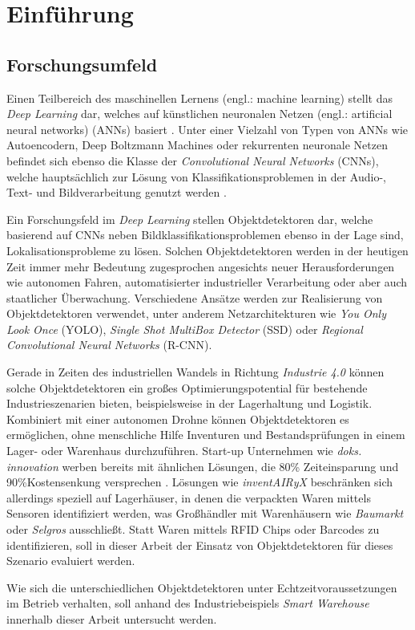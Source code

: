 \chapter{Einführung}

\section{Forschungsumfeld}

Einen Teilbereich des maschinellen Lernens (engl.: machine learning) stellt das \textit{Deep Learning} dar, welches auf künstlichen neuronalen Netzen (engl.: artificial neural networks) (ANNs) basiert \cite[S. 253]{AurelienGeron.2018}. Unter einer Vielzahl von Typen von ANNs wie Autoencodern, Deep Boltzmann Machines oder rekurrenten neuronale Netzen befindet sich ebenso die Klasse der \textit{Convolutional Neural Networks} (CNNs), welche hauptsächlich zur Lösung von Klassifikationsproblemen in der Audio-, Text- und Bildverarbeitung genutzt werden \cite{MathWorks.2019}.

Ein Forschungsfeld im \textit{Deep Learning} stellen Objektdetektoren dar, welche basierend auf CNNs neben Bildklassifikationsproblemen ebenso in der Lage sind, Lokalisationsprobleme zu lösen. Solchen Objektdetektoren werden in der heutigen Zeit immer mehr Bedeutung zugesprochen angesichts neuer Herausforderungen wie autonomen Fahren, automatisierter industrieller Verarbeitung oder aber auch staatlicher Überwachung. Verschiedene Ansätze werden zur Realisierung von Objektdetektoren verwendet, unter anderem Netzarchitekturen wie \textit{You Only Look Once} (YOLO), \textit{Single Shot MultiBox Detector} (SSD) oder \textit{Regional Convolutional Neural Networks} (R-CNN). 

Gerade in Zeiten des industriellen Wandels in Richtung \textit{Industrie 4.0} können solche Objektdetektoren ein großes Optimierungspotential für bestehende Industrieszenarien bieten, beispielsweise in der Lagerhaltung und Logistik. Kombiniert mit einer autonomen Drohne können Objektdetektoren es ermöglichen, ohne menschliche Hilfe Inventuren und Bestandsprüfungen in einem Lager- oder Warenhaus durchzuführen. Start-up Unternehmen wie \textit{doks. innovation} werben bereits mit ähnlichen Lösungen, die 80\% Zeiteinsparung und 90\%Kostensenkung versprechen \cite{doks.innovation.2019}. Lösungen wie \textit{inventAIRyX} beschränken sich allerdings speziell auf Lagerhäuser, in denen die verpackten Waren mittels Sensoren identifiziert werden, was Großhändler mit Warenhäusern wie \textit{Baumarkt} oder \textit{Selgros} ausschließt. Statt Waren mittels RFID Chips oder Barcodes zu identifizieren, soll in dieser Arbeit der Einsatz von Objektdetektoren für dieses Szenario evaluiert werden.

Wie sich die unterschiedlichen Objektdetektoren unter Echtzeitvoraussetzungen im Betrieb verhalten, soll anhand des Industriebeispiels \textit{Smart Warehouse} innerhalb dieser Arbeit untersucht werden. 

